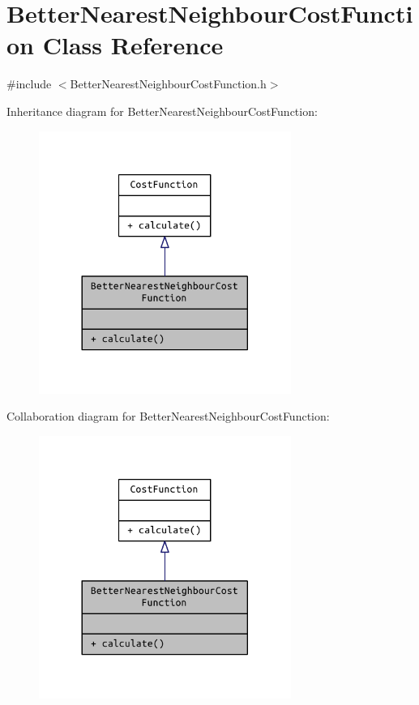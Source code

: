 \hypertarget{class_better_nearest_neighbour_cost_function}{}\section{Better\+Nearest\+Neighbour\+Cost\+Function Class Reference}
\label{class_better_nearest_neighbour_cost_function}


{\ttfamily \#include $<$Better\+Nearest\+Neighbour\+Cost\+Function.\+h$>$}



Inheritance diagram for Better\+Nearest\+Neighbour\+Cost\+Function\+:
\nopagebreak
\begin{figure}[H]
\begin{center}
\leavevmode
\includegraphics[width=233pt]{class_better_nearest_neighbour_cost_function__inherit__graph}
\end{center}
\end{figure}


Collaboration diagram for Better\+Nearest\+Neighbour\+Cost\+Function\+:
\nopagebreak
\begin{figure}[H]
\begin{center}
\leavevmode
\includegraphics[width=233pt]{class_better_nearest_neighbour_cost_function__coll__graph}
\end{center}
\end{figure}
